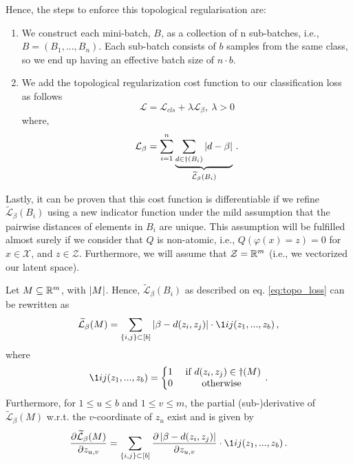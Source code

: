 \documentclass[../main.tex]{subfiles}
\begin{document}
Hence, the steps to enforce this topological regularisation are:

\begin{enumerate}
    \item We construct each mini-batch, $B$, as a collection of n sub-batches, i.e., $B = (B_1, . . . , B_n)$. Each sub-batch consists of $b$ samples from the same class, so we end up having an effective batch size of $n\cdot b$.
    \item We add the topological regularization cost function to our classification loss as follows
    \begin{equation}
    \label{eq:topo_reg}
    \mathcal{L} = \mathcal{L}_{cls} + \lambda\mathcal{L}_\beta,\ \lambda > 0 
    \end{equation}
    where,
    \begin{equation}
    \label{eq:topo_loss}
    \mathcal{L}_\beta = \sum_{i=1}^{n} \underbrace{\sum_{d \in \dag(B_i)} \left\lvert d-\beta \right\rvert}_{\widetilde{\mathcal{L}}_\beta(B_i)}\,.
    \end{equation}
\end{enumerate}

Lastly, it can be proven that this cost function is differentiable if we refine $\tilde{\mathcal{L}}_\beta(B_i)$ using a new indicator function under the mild assumption that the pairwise distances of elements in $B_i$ are unique. This assumption will be fulfilled almost surely if we consider that $Q$ is non-atomic, i.e., $Q(\varphi(x) = z)=0$ for $x \in \mathcal{X}$, and $z \in \mathcal{Z}$. Furthermore, we will assume that $\mathcal{Z}=\mathbb{R}^m$ (i.e., we vectorized our latent space).

\begin{theorem}
Let $M \subseteq \mathbb{R}^m$, with $\left\lvert M \right\rvert$. Hence, $\widetilde{\mathcal{L}}_\beta(B_i)$ as described on eq. \ref{eq:topo_loss} can be rewritten as
\[
\widetilde{\mathcal{L}}_\beta(M) = \sum_{\{i,j\} \subset [b]} \abs{\beta - d(z_i, z_j)} \cdot \1{i}{j}(z_1, ..., z_b)\,,
\]
where
\[
\1{i}{j}(z_1, ..., z_b) = \left\{\begin{matrix}
1 & \text{ if } d(z_i, z_j) \in \dag(M)\\
0 & \text{ otherwise } \\
\end{matrix}\right.\,.
\]
Furthermore, for $1\leq u \leq b$ and $1 \leq v \leq m$, the partial (sub-)derivative of  $\widetilde{\mathcal{L}}_\beta(M)$ w.r.t. the $v$-coordinate of $z_u$ exist and is given by
\[
\frac{\partial \widetilde{\mathcal{L}}_\beta(M)}{\partial z_{u,v}} = \sum_{\{i,j\} \subset [b]} \frac{\partial \abs{\beta - d(z_i, z_j)}}{\partial z_{u,v}} \cdot \1{i}{j}(z_1, ..., z_b)\,.
\]
\end{theorem}
\end{document}
